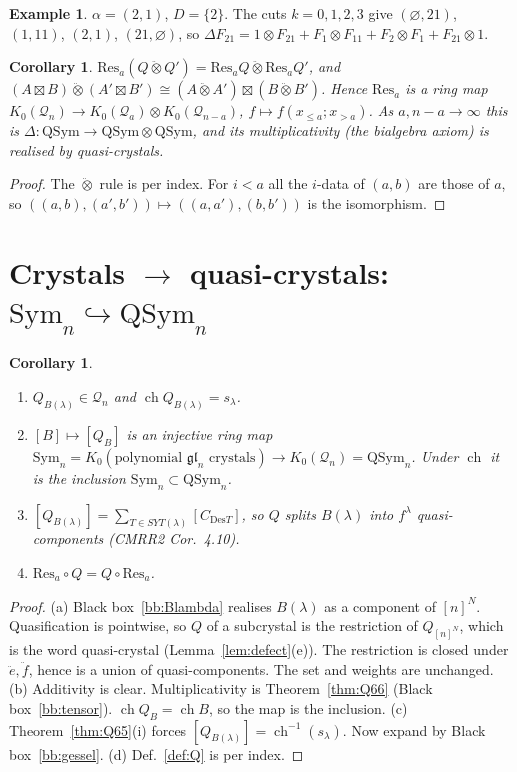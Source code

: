 \documentclass[11pt]{amsart}
\newtheorem{corollary}[theorem]{Corollary}
\theoremstyle{definition}
\newtheorem{example}[theorem]{Example}
\theoremstyle{remark}
\newcommand{\ee}{\ddot e}
\newcommand{\ff}{\ddot f}
\newcommand{\qt}{\mathbin{\ddot\otimes}}
\newcommand{\QSym}{\mathrm{QSym}}
\newcommand{\Sym}{\mathrm{Sym}}
\newcommand{\cQ}{\mathcal{Q}}
\newcommand{\Res}{\mathrm{Res}}
\begin{document}
\begin{example}
$\alpha=(2,1)$, $D=\{2\}$. The cuts $k=0,1,2,3$ give $(\varnothing,21)$, $(1,11)$, $(2,1)$, $(21,\varnothing)$, so $\Delta F_{21}=1\otimes F_{21}+F_1\otimes F_{11}+F_2\otimes F_1+F_{21}\otimes1$.
\end{example}

\begin{corollary}
$\Res_a(Q\qt Q')=\Res_aQ\qt\Res_aQ'$, and $(A\boxtimes B)\qt(A'\boxtimes B')\cong(A\qt A')\boxtimes(B\qt B')$. Hence $\Res_a$ is a ring map $K_0(\cQ_n)\to K_0(\cQ_a)\otimes K_0(\cQ_{n-a})$, $f\mapsto f(x_{\le a};x_{>a})$. As $a,n-a\to\infty$ this is $\Delta:\QSym\to\QSym\otimes\QSym$, and its multiplicativity (the bialgebra axiom) is realised by quasi-crystals.
\end{corollary}
\begin{proof}
The $\qt$ rule is per index. For $i<a$ all the $i$-data of $(a,b)$ are those of $a$, so $((a,b),(a',b'))\mapsto((a,a'),(b,b'))$ is the isomorphism.
\end{proof}

\section{Crystals $\to$ quasi-crystals: $\Sym_n\hookrightarrow\QSym_n$}\label{sec:sym}

\begin{corollary}\label{cor:sym}
\begin{enumerate}[label=(\alph*)]
\item $Q_{B(\lambda)}\in\cQ_n$ and $\operatorname{ch}Q_{B(\lambda)}=s_\lambda$.
\item $[B]\mapsto[Q_B]$ is an injective ring map $\Sym_n=K_0(\text{polynomial }\mathfrak{gl}_n\text{ crystals})\to K_0(\cQ_n)=\QSym_n$. Under $\operatorname{ch}$ it is the inclusion $\Sym_n\subset\QSym_n$.
\item $[Q_{B(\lambda)}]=\sum_{T\in SYT(\lambda)}[C_{\mathrm{Des}T}]$, so $Q$ splits $B(\lambda)$ into $f^\lambda$ quasi-components (CMRR2 Cor.~4.10).
\item $\Res_a\circ Q=Q\circ\Res_a$.
\end{enumerate}
\end{corollary}
\begin{proof}
(a) Black box~\ref{bb:Blambda} realises $B(\lambda)$ as a component of $[n]^N$. Quasification is pointwise, so $Q$ of a subcrystal is the restriction of $Q_{[n]^N}$, which is the word quasi-crystal (Lemma~\ref{lem:defect}(e)). The restriction is closed under $\ee,\ff$, hence is a union of quasi-components. The set and weights are unchanged.
(b) Additivity is clear. Multiplicativity is Theorem~\ref{thm:Q66} (Black box~\ref{bb:tensor}). $\operatorname{ch}Q_B=\operatorname{ch}B$, so the map is the inclusion.
(c) Theorem~\ref{thm:Q65}(i) forces $[Q_{B(\lambda)}]=\operatorname{ch}^{-1}(s_\lambda)$. Now expand by Black box~\ref{bb:gessel}.
(d) Def.~\ref{def:Q} is per index.
\end{proof}
\end{document}
